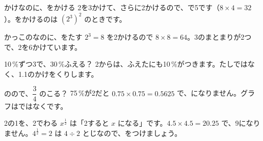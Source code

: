 \label{bk:3-11:tsuma}

\begin{tsumazuki}{かけなのに、をかける}
2を3かけて、さらに2かけるので、で5です（$8\times4=32$）。をかけるのは $(2^3)^2$ のときです。
\end{tsumazuki}

\begin{tsumazuki}{かっこのなのに、をたす}
$2^3=8$ を2かけるので $8\times8=64$。3のまとまりが2つで、2を6かけています。
\end{tsumazuki}

\begin{tsumazuki}{10\,\%ずつ3で、30\,\%ふえる？}
2からは、ふえたにも10\,\%がつきます。たしではなく、1.1のかけをくりします。
\end{tsumazuki}

\begin{tsumazuki}{のので、$\dfrac{3}{4}$ のこる？}
75\,\%が2だと $0.75\times0.75=0.5625$ で、になりません。グラフはではなくです。
\end{tsumazuki}

\begin{tsumazuki}{2の1を、2でわる}
$x^{\frac{1}{2}}$ は「2すると $x$ になる」です。$4.5\times4.5=20.25$ で、9になりません。$4^{\frac{1}{2}}=2$ は $4\div2$ とじなので、をつけましょう。
\end{tsumazuki}

